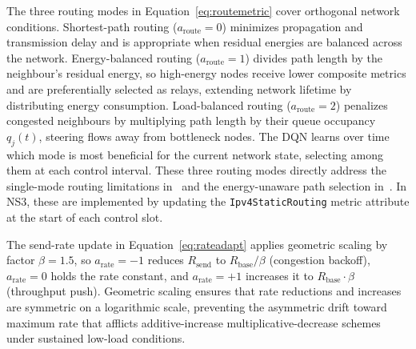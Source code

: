 \documentclass[a4paper]{cas-dc}
\numberwithin{equation}{section}
\begin{document}
The three routing modes in Equation~\ref{eq:routemetric} cover orthogonal network conditions. Shortest-path routing ($a_{\text{route}}=0$) minimizes propagation and transmission delay and is appropriate when residual energies are balanced across the network. Energy-balanced routing ($a_{\text{route}}=1$) divides path length by the neighbour's residual energy, so high-energy nodes receive lower composite metrics and are preferentially selected as relays, extending network lifetime by distributing energy consumption. Load-balanced routing ($a_{\text{route}}=2$) penalizes congested neighbours by multiplying path length by their queue occupancy $q_j(t)$, steering flows away from bottleneck nodes. The DQN learns over time which mode is most beneficial for the current network state, selecting among them at each control interval. These three routing modes directly address the single-mode routing limitations in~\cite{Benelhouri2023} and the energy-unaware path selection in~\cite{Zhang2025}. In NS3, these are implemented by updating the \texttt{Ipv4StaticRouting} metric attribute at the start of each control slot.

The send-rate update in Equation~\ref{eq:rateadapt} applies geometric scaling by factor $\beta=1.5$, so $a_{\text{rate}}=-1$ reduces $R_{\text{send}}$ to $R_{\text{base}}/\beta$ (congestion backoff), $a_{\text{rate}}=0$ holds the rate constant, and $a_{\text{rate}}=+1$ increases it to $R_{\text{base}}\cdot\beta$ (throughput push). Geometric scaling ensures that rate reductions and increases are symmetric on a logarithmic scale, preventing the asymmetric drift toward maximum rate that afflicts additive-increase multiplicative-decrease schemes under sustained low-load conditions.
\end{document}
